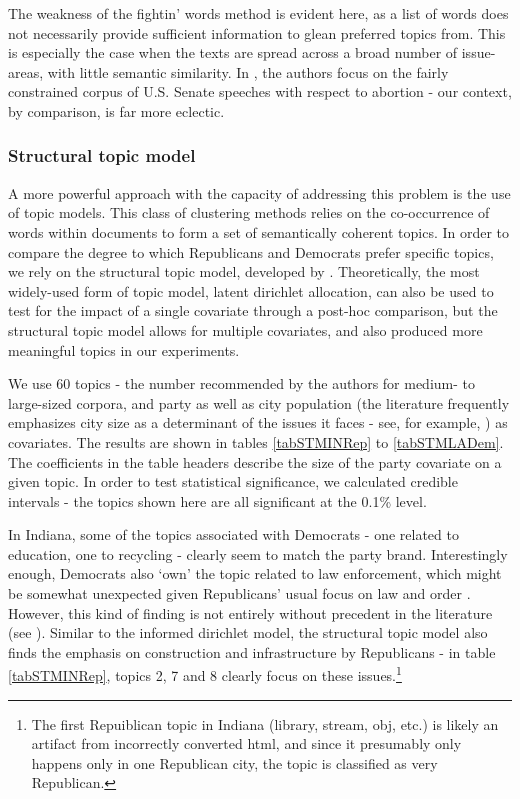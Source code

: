 \documentclass[11pt]{article}
\begin{document}

The weakness of the fightin' words method is evident here, as a list of words does not necessarily provide sufficient information to glean preferred topics from. This is especially the case when the texts are spread across a broad number of issue-areas, with little semantic similarity. In \citep{Monroe2008}, the authors focus on the fairly constrained corpus of U.S. Senate speeches with respect to abortion - our context, by comparison, is far more eclectic.

\subsubsection{Structural topic model}
A more powerful approach with the capacity of addressing this problem is the use of topic models. This class of clustering methods relies on the co-occurrence of words within documents to form a set of semantically coherent topics. In order to compare the degree to which Republicans and Democrats prefer specific topics, we rely on the structural topic model, developed by \citep{Roberts2014}. Theoretically, the most widely-used form of topic model, latent dirichlet allocation, can also be used to test for the impact of a single covariate through a post-hoc comparison, but the structural topic model allows for multiple covariates, and also produced more meaningful topics in our experiments.

We use 60 topics - the number recommended by the authors for medium- to large-sized corpora, and party as well as city population (the literature frequently emphasizes city size as a determinant of the issues it faces - see, for example, \cite{Guillamon2013}) as covariates. The results are shown in tables \ref{tabSTMINRep} to \ref{tabSTMLADem}. The coefficients in the table headers describe the size of the party covariate on a given topic. In order to test statistical significance, we calculated credible intervals - the topics shown here are all significant at the 0.1\% level.

In Indiana, some of the topics associated with Democrats - one related to education, one to recycling  - clearly seem to match the party brand. Interestingly enough, Democrats also `own' the topic related to law enforcement, which might be somewhat unexpected given Republicans' usual focus on law and order \citep{Gerber2011a}. However, this kind of finding is not entirely without precedent in the literature (see \citep{Einstein2015}). Similar to the informed dirichlet model, the structural topic model also finds the emphasis on construction and infrastructure by Republicans - in table \ref{tabSTMINRep}, topics 2, 7 and 8 clearly focus on these issues.\footnote{The first Repuiblican topic in Indiana (library, stream, obj, etc.) is likely an artifact from incorrectly converted html, and since it presumably only happens only in one Republican city, the topic is classified as very Republican.}
\end{document}
